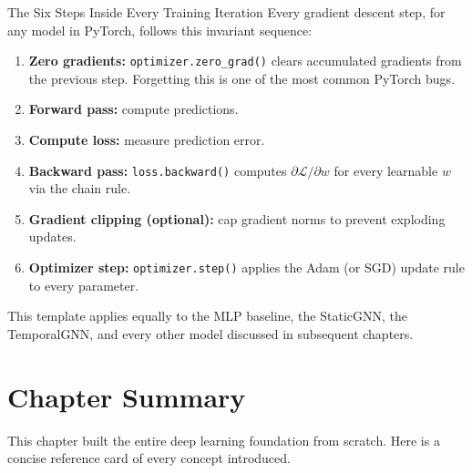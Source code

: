 \begin{conceptbox}{The Six Steps Inside Every Training Iteration}
Every gradient descent step, for any model in PyTorch, follows this invariant sequence:
\begin{enumerate}
    \item \textbf{Zero gradients:} \texttt{optimizer.zero\_grad()} clears accumulated gradients from the previous step. Forgetting this is one of the most common PyTorch bugs.
    \item \textbf{Forward pass:} compute predictions.
    \item \textbf{Compute loss:} measure prediction error.
    \item \textbf{Backward pass:} \texttt{loss.backward()} computes $\partial \mathcal{L} / \partial w$ for every learnable $w$ via the chain rule.
    \item \textbf{Gradient clipping (optional):} cap gradient norms to prevent exploding updates.
    \item \textbf{Optimizer step:} \texttt{optimizer.step()} applies the Adam (or SGD) update rule to every parameter.
\end{enumerate}
This template applies equally to the MLP baseline, the StaticGNN, the TemporalGNN, and every other model discussed in subsequent chapters.
\end{conceptbox}

\section{Chapter Summary}
\label{sec:dl_summary}

This chapter built the entire deep learning foundation from scratch. Here is a concise reference card of every concept introduced.

